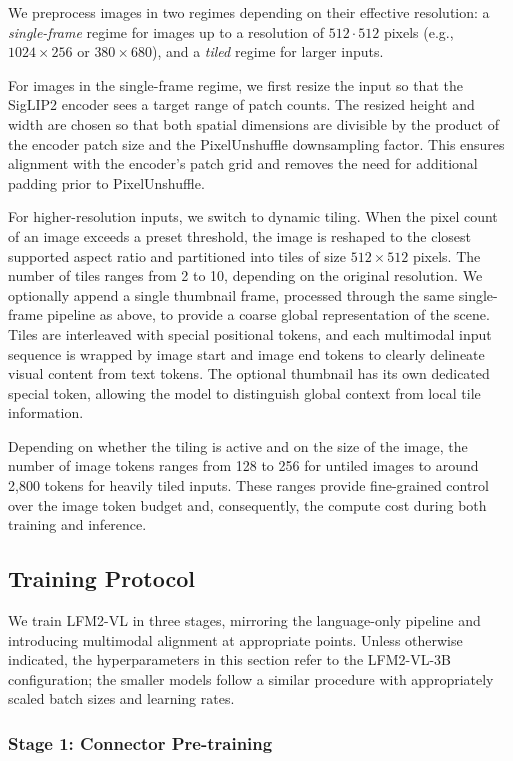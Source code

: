 \documentclass{article}
\begin{document}
We preprocess images in two regimes depending on their effective resolution: a \emph{single-frame} regime for images up to a resolution of \(512 \cdot  512\) pixels (e.g., \(1024 \times 256\) or \(380 \times 680\)), and a \emph{tiled} regime for larger inputs.

For images in the single-frame regime, we first resize the input so that the SigLIP2 encoder sees a target range of patch counts. The resized height and width are chosen so that both spatial dimensions are divisible by the product of the encoder patch size and the PixelUnshuffle downsampling factor. This ensures alignment with the encoder’s patch grid and removes the need for additional padding prior to PixelUnshuffle. 

For higher-resolution inputs, we switch to dynamic tiling. When the pixel count of an image exceeds a preset threshold, the image is reshaped to the closest supported aspect ratio and partitioned into tiles of size \(512\times 512\) pixels. The number of tiles ranges from 2 to 10, depending on the original resolution. We optionally append a single thumbnail frame, processed through the same single-frame pipeline as above, to provide a coarse global representation of the scene. Tiles are interleaved with special positional tokens, and each multimodal input sequence is wrapped by image start and image end tokens to clearly delineate visual content from text tokens. The optional thumbnail has its own dedicated special token, allowing the model to distinguish global context from local tile information.

Depending on whether the tiling is active and on the size of the image, the number of image tokens ranges from 128 to 256 for untiled images to around 2,800 tokens for heavily tiled inputs. These ranges provide fine-grained control over the image token budget and, consequently, the compute cost during both training and inference.

\subsection{Training Protocol}
\label{subsec:vlm_training}
We train LFM2-VL in three stages, mirroring the language-only pipeline and introducing multimodal alignment at appropriate points. Unless otherwise indicated, the hyperparameters in this section refer to the LFM2-VL-3B configuration; the smaller models follow a similar procedure with appropriately scaled batch sizes and learning rates.

\subsubsection{Stage 1: Connector Pre-training}
\end{document}

